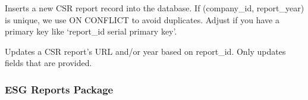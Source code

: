 \documentclass[letterpaper,10pt,english]{sphinxmanual}
\begin{document}
\begin{fulllineitems}
\begin{fulllineitems}
\begin{quote}
\begin{description}
\end{description}\end{quote}

\end{fulllineitems}


\begin{fulllineitems}
\label{\detokenize{src.database:src.database.postgres.PostgreSQLDB.store_csr_report}}
\pysigstartsignatures
\pysiglinewithargsret
{}
{\sphinxparamcomma {}\sphinxparamcomma {}}
{}
\pysigstopsignatures
\sphinxAtStartPar
Inserts a new CSR report record into the database.
If (company\_id, report\_year) is unique, we use ON CONFLICT to avoid duplicates.
Adjust if you have a primary key like ‘report\_id serial primary key’.

\end{fulllineitems}


\begin{fulllineitems}
\label{\detokenize{src.database:src.database.postgres.PostgreSQLDB.update_csr_report}}
\pysigstartsignatures
\pysiglinewithargsret
{}
{\sphinxparamcomma {}\sphinxparamcomma {}}
{}
\pysigstopsignatures
\sphinxAtStartPar
Updates a CSR report’s URL and/or year based on report\_id.
Only updates fields that are provided.

\end{fulllineitems}


\end{fulllineitems}


\sphinxstepscope


\subsubsection{ESG Reports Package}
\label{\detokenize{src.esg_reports:esg-reports-package}}\label{\detokenize{src.esg_reports::doc}}\subsubsection*{}
\end{document}
